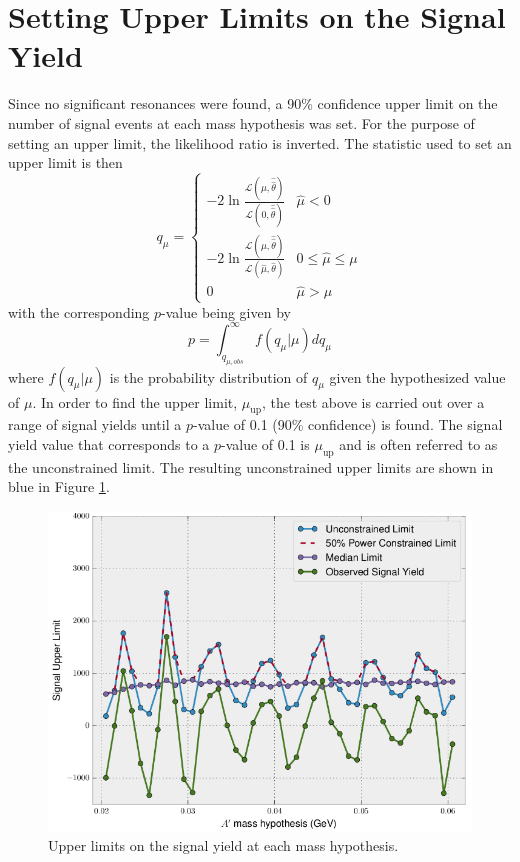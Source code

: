 \section{Setting Upper Limits on the Signal Yield}

Since no significant resonances were found, a 90\% confidence upper limit on the number
of signal events at each mass hypothesis was set.  For the purpose of setting
an upper limit, the likelihood ratio is inverted.  The statistic used
to set an upper limit is then
\begin{equation}
    q_{\mu} = \begin{cases}
        -2 \ln \frac{\mathcal{L}(\mu, \hat{\hat{\theta}})}{\mathcal{L}(0, \hat{\hat{\theta}})} 
            & \hat{\mu} < 0 \\
        -2 \ln \frac{\mathcal{L}(\mu, \hat{\hat{\theta}})}{\mathcal{L}(\hat{\mu}, \hat{\theta})} 
            & 0 \leq \hat{\mu} \leq \mu \\
             0  & \hat{\mu} > \mu
        \end{cases}
\end{equation}
with the corresponding $p$-value being given by
\begin{equation}
    p = \int_{q_{\mu,obs}}^{\infty} f(q_{\mu} | \mu) dq_{\mu}
\end{equation}
where $f(q_{\mu}|\mu)$ is the probability distribution of $q_{\mu}$ given the
hypothesized value of $\mu$. 
In order to find the upper limit, $\mu_{\text{up}}$, the test above is carried out over a range of
signal yields until a $p$-value of 0.1 (90\% confidence) is found.  The signal
yield value that corresponds to a $p$-value of 0.1 is $\mu_{\text{up}}$
and is often referred to as the unconstrained limit. 
The resulting 
unconstrained upper limits are shown in blue in Figure \ref{fig:upper_limit}. 
\begin{figure}[t]
    \centering
    \includegraphics[width=\textwidth]{images/upper_limits.png}
    \caption{Upper limits on the signal yield at each mass hypothesis.}
    \label{fig:upper_limit}
\end{figure}

